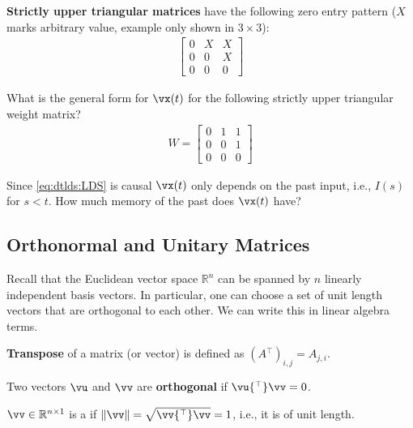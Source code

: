 \documentclass[a4paper,11pt]{exam}
\newcounter{ct}
\newcommand{\trp}{{^\top}} %
\newcommand{\norm}[1]{\ensuremath{\Vert{#1}\Vert}}
\newcommand{\field}[1]{\ensuremath{\mathbb{#1}}}
\newcommand{\reals}{\field{R}}
\begin{document}
\begin{questions}
\clearpage
\textbf{Strictly upper triangular matrices} have the following zero entry pattern ($X$ marks arbitrary value, example only shown in $3 \times 3$):
\begin{align}\label{eq:LA:suppertri}
    \begin{bmatrix}
	0 & X & X \\
	0 & 0 & X\\
	0 & 0 & 0
    \end{bmatrix}
\end{align}

\question What is the general form for $\vx(t)$ for the following strictly upper triangular weight matrix?
\begin{align}\label{eq:LA:suppertri:eg}
    W
    =
    \begin{bmatrix}
	0 & 1 & 1 \\
	0 & 0 & 1\\
	0 & 0 & 0
    \end{bmatrix}
\end{align}

\question Since \eqref{eq:dtlds:LDS} is causal $\vx(t)$ only depends on the past input, i.e., $I(s)$ for $s < t$.
How much memory of the past does $\vx(t)$ have?

\subsection{Orthonormal and Unitary Matrices}
Recall that the Euclidean vector space $\reals^n$ can be spanned by $n$ linearly independent basis vectors.
In particular, one can choose a set of unit length vectors that are orthogonal to each other.
We can write this in linear algebra terms.

\begin{tcolorbox}
    \textbf{Transpose} of a matrix (or vector) is defined as $(A\trp)_{i,j} = A_{j,i}$.
\end{tcolorbox}
\begin{tcolorbox}
    Two vectors $\vu$ and $\vv$ are \textbf{orthogonal} if $\vu\trp \vv = 0$.
\end{tcolorbox}
\begin{tcolorbox}
    $\vv \in \reals^{n \times 1}$ is a  if $\norm{\vv} = \sqrt{\vv\trp \vv} = 1$, i.e., it is of unit length.
\end{tcolorbox}


\end{questions}
\end{document}
